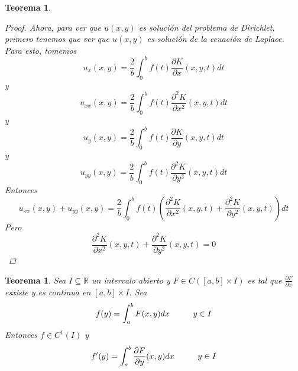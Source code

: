 \documentclass[11pt]{book}
\theoremstyle{plain}
\newtheorem{teo}[proposición]{Teorema}
\theoremstyle{definition}
\newcommand{\R}{\mathbb{R}}
\begin{document}
\begin{teo}
\begin{proof}
            Ahora, para ver que $u(x,y)$ es solución del problema de Dirichlet, primero tenemos que ver que $u(x,y)$ es solución de la ecuación de Laplace. Para esto, tomemos
            \[
                u_{x}(x,y) = \frac{2}{b}\int_{0}^{b} f(t)\frac{\partial K}{\partial x}(x,y,t)dt
            \]
            y
            \[
                u_{xx}(x,y) = \frac{2}{b}\int_{0}^{b} f(t)\frac{\partial^{2} K}{\partial x^{2}}(x,y,t)dt
            \]
            y
            \[
                u_{y}(x,y) = \frac{2}{b}\int_{0}^{b} f(t)\frac{\partial K}{\partial y}(x,y,t)dt
            \]
            y
            \[
                u_{yy}(x,y) = \frac{2}{b}\int_{0}^{b} f(t)\frac{\partial^{2} K}{\partial y^{2}}(x,y,t)dt
            \]
            Entonces
            \[
                u_{xx}(x,y) + u_{yy}(x,y) = \frac{2}{b}\int_{0}^{b} f(t)\left(\frac{\partial^{2} K}{\partial x^{2}}(x,y,t) + \frac{\partial^{2} K}{\partial y^{2}}(x,y,t)\right)dt
            \]
            Pero
            \[
                \frac{\partial^{2} K}{\partial x^{2}}(x,y,t) + \frac{\partial^{2} K}{\partial y^{2}}(x,y,t) = 0
            \]
        \end{proof}
    \end{teo}

    \begin{teo}
        Sea $I \subseteq \R$ un intervalo abierto y $F \in C([a,b]\times I)$ es tal que $\frac{\partial F}{\partial x}$ esxiste y es continua en $[a,b]\times I$. Sea
        \[
            f(y) = \int_{a}^{b} F(x,y)dx \hspace{10mm} y \in I
        \]
        Entonces $f \in C^{1}(I)$ y
        \[
            f'(y) = \int_{a}^{b} \frac{\partial F}{\partial y}(x,y)dx \hspace{10mm} y \in I
        \]
    \end{teo}
\end{document}
